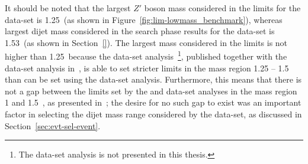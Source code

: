 It should be noted that the largest $Z'$ boson mass considered in the limits for the \lm{} data-set is
1.25~\TeV (as shown in Figure~\ref{fig:lim-lowmass_benchmark}),
whereas largest dijet mass considered in the search phase results
for the \lm{} data-set is 1.53~\TeV (as shown in Section~\ref{}).
The largest mass considered in the limits is not higher than 1.25~\TeV because the \hm{} data-set
analysis~\footnote{ The \hm{} data-set analysis is not presented in this thesis.},
published together with the \lm{} data-set analysis in~\cite{dibjet-full_paper},
is able to set stricter limits in the mass region 1.25 -- 1.5~\GeV{}
than can be set using the \lm{} data-set analysis.
Furthermore, this means that there is not a gap between the limits set by the \lm{} and \hm{} data-set analyses in the mass region 1 and 1.5~\TeV, as presented in~\cite{dibjet-full_paper};
the desire for no such gap to exist was an important factor in selecting the dijet mass range considered by the \lm{} data-set, as discussed in Section~\ref{sec:evt-sel-event}.


